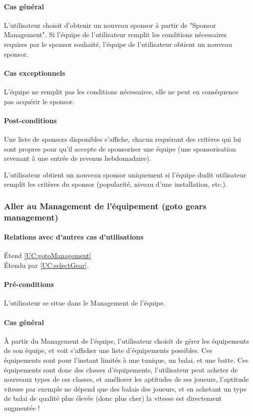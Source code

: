 \paragraph{Cas général}
L'utilisateur choisit d'obtenir un nouveau sponsor à partir de "Sponsor Management". Si l'équipe de l'utilisateur remplit les conditions nécessaires requises par le sponsor souhaité, l'équipe de l'utilisateur obtient un nouveau sponsor. 
\paragraph{Cas exceptionnels}
L'équipe ne remplit pas les conditions nécessaires, elle ne peut en conséquence pas acquérir le sponsor. 
\paragraph{Post-conditions}
\begin{list}{}{\leftmargin=1.5em}
\item{Une liste de sponsors disponibles s'affiche, chacun requérant des critères qui lui sont propres pour qu'il accepte de sponsoriser une équipe (une sponsorisation revenant à une entrée de revenus hebdomadaire).}
\item{L'utilisateur obtient un nouveau sponsor uniquement si l'équipe dudit utilisateur remplit les critères du sponsor (popularité, niveau d'une installation, etc.).}
\end{list}

\subsubsection{Aller au Management de l'équipement (goto gears management)}
\label{UC:gotoGear}
\paragraph{Relations avec d'autres cas d'utilisations}
Étend \ref{UC:gotoManagement}\\
Étendu par \ref{UC:selectGear}.
\paragraph{Pré-conditions}
\begin{list}{}{\leftmargin=1.5em}
\item{L'utilisateur se situe dans le Management de l'équipe.}
\end{list}
\paragraph{Cas général}
À partir du Management de l'équipe, l'utilisateur choisit de gérer les équipements de son équipe, et voit s'afficher une liste d'équipements possibles. Ces équipements sont pour l'instant limités à une tunique, un balai, et une batte. Ces équipements sont donc des classes d'équipements, l'utilisateur peut acheter de nouveaux types de ces classes, et améliorer les aptitudes de ses joueurs, l'aptitude vitesse par exemple ne dépend que des balais des joueurs, et en achetant un type de balai de qualité plus élevée (donc plus cher) la vitesse est directement augmentée !
